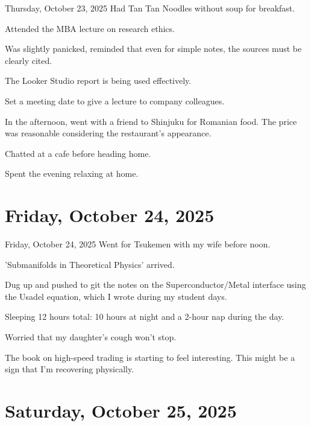 \documentclass[dvipdfmx, autodetect-engine, aspectratio=169, 10.5pt]{beamer}
\begin{document}
\begin{frame}{Thursday, October 23, 2025}
	Had Tan Tan Noodles without soup for breakfast.

	Attended the MBA lecture on research ethics.

	Was slightly panicked, reminded that even for simple notes, the sources must be clearly cited.

	The Looker Studio report is being used effectively.

	Set a meeting date to give a lecture to company colleagues.

	In the afternoon, went with a friend to Shinjuku for Romanian food.
	The price was reasonable considering the restaurant's appearance.

	Chatted at a cafe before heading home.

	Spent the evening relaxing at home.
\end{frame}

\section{Friday, October 24, 2025}

\begin{frame}{Friday, October 24, 2025}
	Went for Tsukemen with my wife before noon.

	'Submanifolds in Theoretical Physics' arrived.

	Dug up and pushed to git the notes on the Superconductor/Metal interface using the Usadel equation, which I wrote during my student days.

	Sleeping 12 hours total: 10 hours at night and a 2-hour nap during the day.

	Worried that my daughter's cough won't stop.

	The book on high-speed trading is starting to feel interesting.
	This might be a sign that I'm recovering physically.
\end{frame}

\section{Saturday, October 25, 2025}
\end{document}

